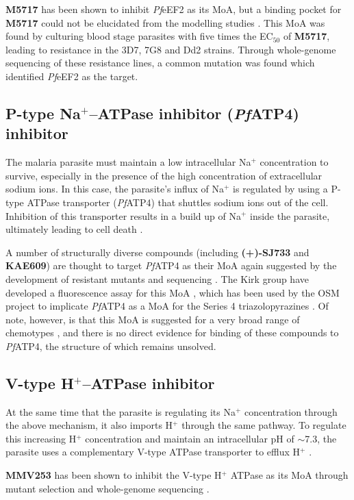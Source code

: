\documentclass[twocolumn]{bmcart}%
\begin{document}
\textbf{M5717} has been shown to inhibit \textit{Pf}eEF2 as its MoA, but a binding pocket for \textbf{M5717} could not be elucidated from the modelling studies \cite{Baragana2015}. This MoA was found by culturing blood stage parasites with five times the EC$_{50}$ of \textbf{M5717}, leading to resistance in the 3D7, 7G8 and Dd2 strains. Through whole-genome sequencing of these resistance lines, a common mutation was found which identified \textit{Pf}eEF2 as the target.

\subsection*{P-type Na$^+$--ATPase inhibitor (\textit{Pf}ATP4) inhibitor}
The malaria parasite must maintain a low intracellular Na$^+$ concentration to survive, especially in the presence of the high concentration of extracellular sodium ions. In this case, the parasite's influx of Na$^+$ is regulated by using a P-type ATPase transporter (\textit{Pf}ATP4) that shuttles sodium ions out of the cell. Inhibition of this transporter results in a build up of Na$^+$ inside the parasite, ultimately leading to cell death \cite{Spillman2015}.

A number of structurally diverse compounds (including \textbf{(+)-SJ733} and \textbf{KAE609}) are thought to target \textit{Pf}ATP4 as their MoA again suggested by the development of resistant mutants and sequencing \cite{Rottmann2010}. The Kirk group have developed a fluorescence assay for this MoA \cite{Spillman2013}, which has been used by the OSM project to implicate \textit{Pf}ATP4 as a MoA for the Series 4 triazolopyrazines \cite{Series4Repo}. Of note, however, is that this MoA is suggested for a very broad range of chemotypes \cite{Voorhis2016,Dennis2018}, and there is no direct evidence for binding of these compounds to \textit{Pf}ATP4, the structure of which remains unsolved.

\subsection*{V-type H$^+$--ATPase inhibitor}
At the same time that the parasite is regulating its Na$^+$ concentration through the above mechanism, it also imports H$^+$ through the same pathway. To regulate this increasing H$^+$ concentration and maintain an intracellular pH of $\sim$7.3, the parasite uses a complementary V-type ATPase transporter to efflux H$^+$ \cite{Saliba1999}.

\textbf{MMV253} has been shown to inhibit the V-type H$^+$ ATPase as its MoA through mutant selection and whole-genome sequencing \cite{Hameed2015}.
\end{document}
